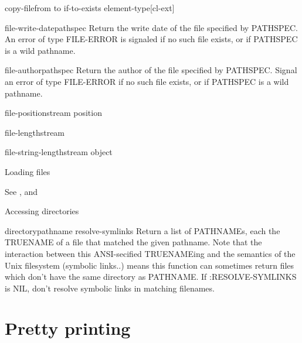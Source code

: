 \documentclass[10pt,english]{book}
\begin{document}
\begin{function}{copy-file}{from to \key if-to-exists element-type}[cl-ext]
  
\end{function}

\begin{function}{file-write-date}{pathspec}
  Return the write date of the file specified by PATHSPEC.
An error of type FILE-ERROR is signaled if no such file exists,
or if PATHSPEC is a wild pathname.
\end{function}

\begin{function}{file-author}{pathspec}
  Return the author of the file specified by PATHSPEC. Signal an
error of type FILE-ERROR if no such file exists, or if PATHSPEC
is a wild pathname.
\end{function}

\begin{function}{file-position}{stream \op position}
  
\end{function}

\begin{function}{file-length}{stream}
  
\end{function}

\begin{function}{file-string-length}{stream object}
  
\end{function}

Loading files

See ,  and

Accessing directories

\begin{function}{directory}{pathname \key resolve-symlinks}
  Return a list of PATHNAMEs, each the TRUENAME of a file that matched the
   given pathname. Note that the interaction between this ANSI-secified
   TRUENAMEing and the semantics of the Unix filesystem (symbolic links..)
   means this function can sometimes return files which don't have the same
   directory as PATHNAME.  If :RESOLVE-SYMLINKS is NIL, don't resolve
   symbolic links in matching filenames.
\end{function}


\chapter{Pretty printing}
\label{cha:pretty-printing}
\end{document}
